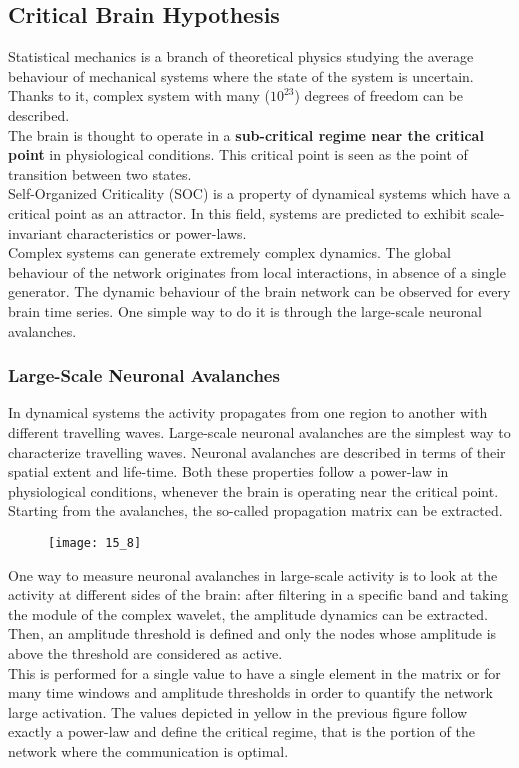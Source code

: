 \subsection{Critical Brain Hypothesis}
Statistical mechanics is a branch of theoretical physics studying the average behaviour of mechanical
systems where the state of the system is uncertain. Thanks to it, complex system with many (\(10^{23}\))
degrees of freedom can be described.\\
The brain is thought to operate in a \textbf{sub-critical regime near the critical point} in
physiological conditions. This critical point is seen as the point of transition between two states.\\
Self-Organized Criticality (SOC) is a property of dynamical systems which have a critical point as an
attractor. In this field, systems are predicted to exhibit scale-invariant characteristics or power-laws.\\
Complex systems can generate extremely complex dynamics. The global behaviour of the network originates
from local interactions, in absence of a single generator. The dynamic behaviour of the brain network
can be observed for every brain time series. One simple way to do it is through the large-scale neuronal
avalanches.
\subsubsection{Large-Scale Neuronal Avalanches}
In dynamical systems the activity propagates from one region to another with different travelling waves.
Large-scale neuronal avalanches are the simplest way to characterize travelling waves. Neuronal
avalanches are described in terms of their spatial extent and life-time. Both these properties follow a
power-law in physiological conditions, whenever the brain is operating near the critical point.
Starting from the avalanches, the so-called propagation matrix can be extracted.
\begin{figure}[H]
    \centering
    \texttt{[image: 15\_8]}
\end{figure}
One way to measure neuronal avalanches in large-scale activity is to look at the activity at different
sides of the brain: after filtering in a specific band and taking the module of the complex wavelet,
the amplitude dynamics can be extracted. Then, an amplitude threshold is defined and only the nodes
whose amplitude is above the threshold are considered as active.\\
This is performed for a single value to have a single element in the matrix or for many time windows
and amplitude thresholds in order to quantify the network large activation. The values depicted in yellow
in the previous figure follow exactly a power-law and define the critical regime, that is the portion of
the network where the communication is optimal.
